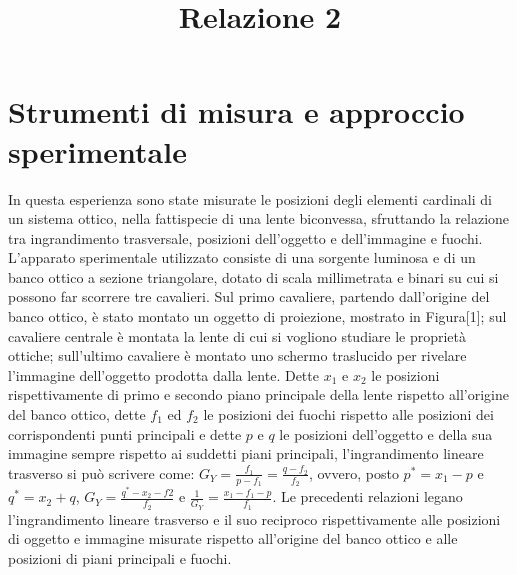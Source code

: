 \documentclass{article}
\title{Relazione 2}
\begin{document}
\maketitle



\section{Strumenti di misura e approccio sperimentale}

In questa esperienza sono state misurate le posizioni degli elementi cardinali di un sistema ottico, nella fattispecie di una lente biconvessa, sfruttando la relazione tra ingrandimento trasversale, posizioni dell'oggetto e dell'immagine e fuochi.
L'apparato sperimentale utilizzato consiste di una sorgente luminosa e di un banco ottico a sezione triangolare, dotato di scala millimetrata e binari su cui si possono far scorrere tre cavalieri. Sul primo cavaliere, partendo dall'origine del banco ottico, è stato montato un oggetto di proiezione, mostrato in Figura[1]; sul cavaliere centrale è montata la lente di cui si vogliono studiare le proprietà ottiche; sull'ultimo cavaliere è montato uno schermo traslucido per rivelare l'immagine dell'oggetto prodotta dalla lente.
Dette $x_1$ e $x_2$ le posizioni rispettivamente di primo e secondo piano principale della lente rispetto all'origine del banco ottico, dette $f_1$ ed $f_2$ le posizioni dei fuochi rispetto alle posizioni dei corrispondenti punti principali e dette $p$ e $q$ le posizioni dell'oggetto e della sua immagine sempre rispetto ai suddetti piani principali, l'ingrandimento lineare trasverso si può scrivere come:
$G_Y=\frac{f_1}{p-f_1}=\frac{q-f_2}{f_2}$,
ovvero, posto $p^*=x_1-p$ e $q^*=x_2+q$,
$G_Y=\frac{q^*-x_2-f2}{f_2}$
e
$\frac{1}{G_Y}=\frac{x_1-f_1-p}{f_1}$.
Le precedenti relazioni legano l'ingrandimento lineare trasverso e il suo reciproco rispettivamente alle posizioni di oggetto e immagine misurate rispetto all'origine del banco ottico e alle posizioni di piani principali e fuochi.
\end{document}
